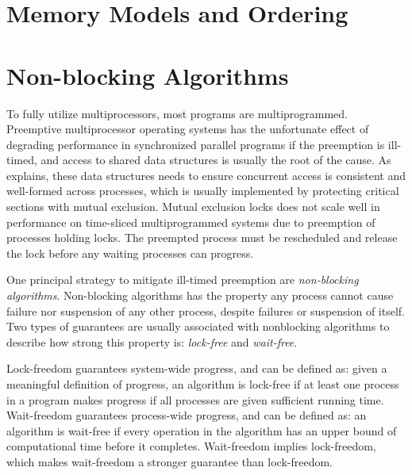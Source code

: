 \section{Memory Models and Ordering}
\label{sec:memory_ordering}




\section{Non\hyp{}blocking Algorithms}
\label{sec:nonblocking_algorithms}

To fully utilize multiprocessors, most programs are multiprogrammed. Preemptive multiprocessor operating systems has the unfortunate effect of degrading performance in synchronized parallel programs if the preemption is ill\hyp{}timed, and access to shared data structures is usually the root of the cause. As \citet{michael1998nonblocking} explains, these data structures needs to ensure concurrent access is consistent and well\hyp{}formed across processes, which is usually implemented by protecting critical sections with mutual exclusion. Mutual exclusion locks does not scale well in performance on time\hyp{}sliced multiprogrammed systems \citep{zahorjan1991effect} due to preemption of processes holding locks. The preempted process must be rescheduled and release the lock before any waiting processes can progress.

One principal strategy to mitigate ill\hyp{}timed preemption are \textit{non\hyp{}blocking algorithms}. Non\hyp{}blocking algorithms has the property any process cannot cause failure nor suspension of any other process, despite failures or suspension of itself. Two types of guarantees are usually associated with nonblocking algorithms to describe how strong this property is: \textit{lock\hyp{}free} and \textit{wait\hyp{}free}. 

Lock\hyp{}freedom guarantees system\hyp{}wide progress, and can be defined as: given a meaningful definition of progress, an algorithm is lock\hyp{}free if at least one process in a program makes progress if all processes are given sufficient running time. Wait\hyp{}freedom guarantees process\hyp{}wide progress, and can be defined as: an algorithm is wait\hyp{}free if every operation in the algorithm has an upper bound of computational time before it completes. Wait\hyp{}freedom implies lock\hyp{}freedom, which makes wait\hyp{}freedom a stronger guarantee than lock\hyp{}freedom.

